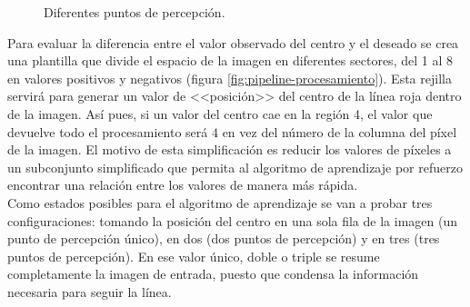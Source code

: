 \begin{figure}[ht!]
  \begin{center}
    \hspace{0.1cm}
  \end{center}
  \centering
  \captionsetup{justification=centering,margin=2cm}
  \caption{Diferentes puntos de percepción.}
  \label{fig:robots-gym-gazebo}
\end{figure}


Para evaluar la diferencia entre el valor observado del centro y el deseado se crea una plantilla que divide el espacio de la imagen en diferentes sectores, del 1 al 8 en valores positivos y negativos (figura \ref{fig:pipeline-procesamiento}). Esta rejilla servirá para generar un valor de <<posición>> del centro de la línea roja dentro de la imagen. Así pues, si un valor del centro cae en la región 4, el valor que devuelve todo el procesamiento será $4$ en vez del número de la columna del píxel de la imagen. El motivo de esta simplificación es reducir los valores de píxeles a un subconjunto simplificado que permita al algoritmo de aprendizaje por refuerzo encontrar una relación entre los valores de manera más rápida.\\

Como estados posibles para el algoritmo de aprendizaje se van a probar tres configuraciones: tomando la posición del centro en una sola fila de la imagen (un punto de percepción único), en dos (dos puntos de percepción) y en tres (tres puntos de percepción). En ese valor único, doble o triple se resume completamente la imagen de entrada, puesto que condensa la información necesaria para seguir la línea.\\

